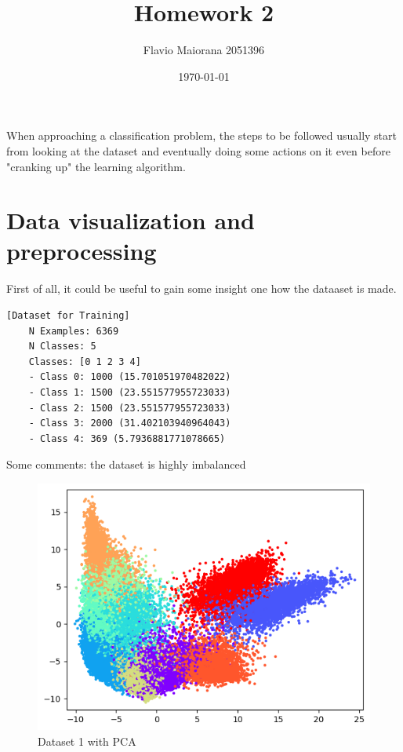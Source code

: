 \documentclass[12pt,a4paper,oneside]{article}
\title{Homework 2}	                                    %
\author{Flavio Maiorana 2051396}				        %
\date{\today}								            %
\begin{document}

\newpage

When approaching a classification problem, the steps to be followed
usually start from looking at the dataset and eventually doing some actions on
it even before "cranking up" the learning algorithm.

\section{Data visualization and preprocessing}

First of all, it could be useful to gain some insight one how the dataaset is
made.

\begin{verbatim}[Dataset for Training]
    N Examples: 6369
    N Classes: 5
    Classes: [0 1 2 3 4]
    - Class 0: 1000 (15.701051970482022)
    - Class 1: 1500 (23.551577955723033)
    - Class 2: 1500 (23.551577955723033)
    - Class 3: 2000 (31.402103940964043)
    - Class 4: 369 (5.7936881771078665)
\end{verbatim}

Some comments: the dataset is highly imbalanced

\begin{figure}[H]
    \includegraphics{figures/dataset1.png}
    \caption{Dataset 1 with PCA}
\end{figure}
\end{document}

